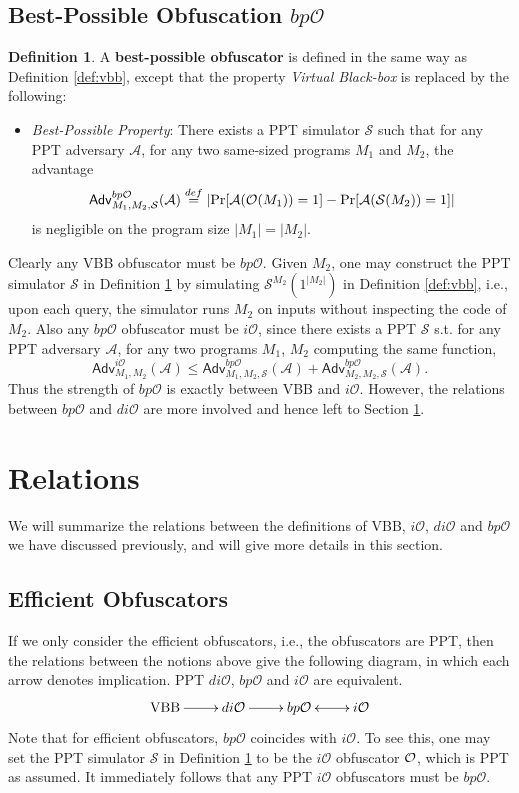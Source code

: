 \documentclass[12pt]{article}
\newcommand{\eqdef}{\stackrel{def}{=}}
\newcommand{\A}{\mathcal{A}}
\newcommand{\Sim}{\mathcal{S}}
\newcommand{\Adv}{\mathsf{Adv}}
\newcommand{\io}{i\mathcal{O}}
\newcommand{\dio}{di\mathcal{O}}
\newcommand{\bpo}{bp\mathcal{O}}
\theoremstyle{definition}
\newtheorem{definition}[theorem]{Definition}
\begin{document}
\subsection{Best-Possible Obfuscation $\bpo$}
\begin{definition}
\label{def:bp}
A {\bf best-possible obfuscator} is defined in the same way as Definition \ref{def:vbb}, except that the property \emph{Virtual Black-box} is replaced by the following:
\begin{itemize}
\item \emph{Best-Possible Property}: There exists a PPT simulator $\Sim$ such that for any PPT adversary $\A$, for any two same-sized programs $M_1$ and $M_2$, the advantage 
$$\Adv_{M_1,M_2,\Sim}^{\bpo}(\A) \eqdef \left| \Pr[\A(\bigoh(M_1)) = 1] - \Pr[\A(\Sim(M_2)) = 1] \right|$$
is negligible on the program size $|M_1| = |M_2|$.
\end{itemize}
\end{definition}
Clearly any VBB obfuscator must be $\bpo$. Given $M_2$, one may construct the PPT simulator $\Sim$ in Definition \ref{def:bp} by simulating $\Sim^{M_2}(1^{|M_2|})$ in Definition \ref{def:vbb}, i.e., upon each query, the simulator runs $M_2$ on inputs without inspecting the code of $M_2$. Also any $\bpo$ obfuscator must be $\io$, since there exists a PPT $\Sim$ s.t. for any PPT adversary $\A$, for any two programs $M_1$, $M_2$ computing the same function,
$$\Adv_{M_1,M_2}^{\io}(\A) \leq \Adv_{M_1,M_2,\Sim}^{\bpo}(\A) + \Adv_{M_2,M_2,\Sim}^{\bpo}(\A).$$ 
Thus the strength of $\bpo$ is exactly between VBB and $\io$. However, the relations between $\bpo$ and $\dio$ are more involved and hence left to Section \ref{sec:rel}.

\section{Relations}
\label{sec:rel}
We will summarize the relations between the definitions of VBB, $\io$, $\dio$ and $\bpo$ we have discussed previously, and will give more details in this section.

\subsection{Efficient Obfuscators}
If we only consider the efficient obfuscators, i.e., the obfuscators are PPT, then the relations between the notions above give the following diagram, in which each arrow denotes implication. PPT $\dio$, $\bpo$ and $\io$ are equivalent.
$$
\xymatrix{
\mathrm{VBB} \ar[r] & \dio \ar[r] & \bpo \ar@{<->}[r] & \io} 
$$
Note that for efficient obfuscators, $\bpo$ coincides with $\io$. To see this, one may set the PPT simulator $\Sim$ in Definition \ref{def:bp} to be the $\io$ obfuscator $\mathcal{O}$, which is PPT as assumed. It immediately follows that any PPT $\io$ obfuscators must be $\bpo$.
\end{document}

